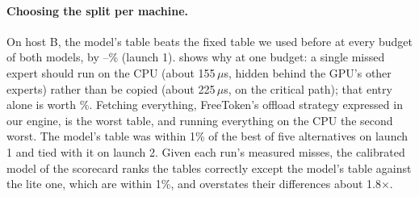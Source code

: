 

\paragraph{Choosing the split per machine.} On host B, the model's table beats the fixed table we used
before at every budget of both models, by \lawGainMin--\lawGainMax\% (launch 1).  shows why at one
budget: a single missed expert should run on the CPU (about 155\,$\mu$s, hidden behind the GPU's other experts) rather
than be copied (about 225\,$\mu$s, on the critical path); that entry alone is worth \splitFOne\%. Fetching everything,
FreeToken's offload strategy expressed in our engine, is the worst table, and running everything on the CPU the second
worst. The model's table was within 1\% of the best of five alternatives on launch 1 and tied with it on launch 2. Given
each run's measured misses, the calibrated model of the scorecard ranks the tables correctly except the model's table against the lite one, which are within 1\%,
and overstates their differences about 1.8$\times$.


